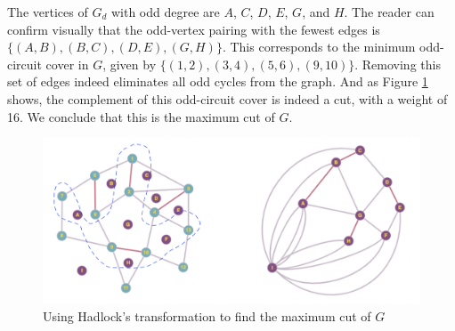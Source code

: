 \par The vertices of $G_d$ with odd degree are $A$, $C$, $D$, $E$, $G$, and $H$. The reader can confirm visually that the odd-vertex pairing with the fewest edges is $\{(A,B),(B,C),(D,E),(G,H)\}$. This corresponds to the minimum odd-circuit cover in $G$, given by $\{(1,2),(3,4),(5,6),(9,10)\}$. Removing this set of edges indeed eliminates all odd cycles from the graph. And as Figure \ref{fig:slightly_complicated_cut} shows, the complement of this odd-circuit cover is indeed a cut, with a weight of 16. We conclude that this is the maximum cut of $G$.

\begin{figure}[h]
    \centering
    \includegraphics[scale=.35]{planar_dual_cut.png}
    \caption{Using Hadlock's transformation to find the maximum cut of $G$}
    \label{fig:slightly_complicated_cut}
\end{figure}